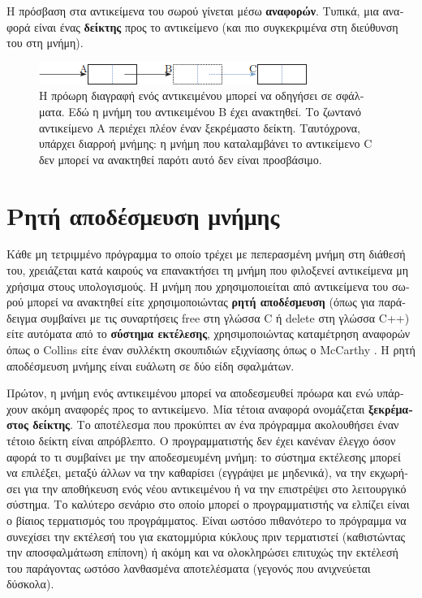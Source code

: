 \begin{greek}
Η πρόσβαση στα αντικείμενα του σωρού γίνεται μέσω \textbf{αναφορών}.
Τυπικά, μια αναφορά είναι ένας \textbf{δείκτης} προς το αντικείμενο
(και πιο συγκεκριμένα στη διεύθυνση του στη μνήμη). 

\begin{figure}[H]
  \centering
  \includegraphics{figures/intro_1}
  \caption[Η πρόωρη διαγραφή ενός αντικειμένου μπορεί να οδηγήσει
           σε σφάλματα]
    {Η πρόωρη διαγραφή ενός αντικειμένου μπορεί να οδηγήσει σε
     σφάλματα. Εδώ η μνήμη του αντικειμένου B έχει ανακτηθεί. Το
     ζωντανό αντικείμενο A περιέχει πλέον έναν ξεκρέμαστο δείκτη.
     Ταυτόχρονα, υπάρχει διαρροή μνήμης: η μνήμη που καταλαμβάνει
     το αντικείμενο C δεν μπορεί να ανακτηθεί παρότι αυτό δεν
     είναι προσβάσιμο.}
   \label{fig:intro_1}  
\end{figure}

\section{Ρητή αποδέσμευση μνήμης}
Κάθε μη τετριμμένο πρόγραμμα το οποίο τρέχει με πεπερασμένη μνήμη
στη διάθεσή του, χρειάζεται κατά καιρούς να επανακτήσει τη μνήμη
που φιλοξενεί αντικείμενα μη χρήσιμα στους υπολογισμούς. Η μνήμη
που χρησιμοποιείται από αντικείμενα του σωρού μπορεί να ανακτηθεί
είτε χρησιμοποιώντας \textbf{ρητή αποδέσμευση} (όπως για παράδειγμα
συμβαίνει με τις συναρτήσεις free στη γλώσσα C ή delete στη
γλώσσα C++) είτε αυτόματα από το \textbf{σύστημα εκτέλεσης},
χρησιμοποιώντας καταμέτρηση αναφορών όπως ο Collins \cite{DBLP:journals/cacm/Collins60}
είτε έναν συλλέκτη σκουπιδιών εξιχνίασης όπως ο McCarthy
\cite{DBLP:journals/cacm/McCarthy60}. Η ρητή αποδέσμευση μνήμης
είναι ευάλωτη σε δύο είδη σφαλμάτων.

Πρώτον, η μνήμη ενός αντικειμένου μπορεί να αποδεσμευθεί πρόωρα και
ενώ υπάρχουν ακόμη αναφορές προς το αντικείμενο. Μία τέτοια αναφορά
ονομάζεται \textbf{ξεκρέμαστος δείκτης}. Το αποτέλεσμα που προκύπτει
αν ένα πρόγραμμα ακολουθήσει έναν τέτοιο δείκτη είναι απρόβλεπτο.
Ο προγραμματιστής δεν έχει κανέναν έλεγχο όσον αφορά το τι συμβαίνει
με την αποδεσμευμένη μνήμη: το σύστημα εκτέλεσης μπορεί να επιλέξει,
μεταξύ άλλων να την καθαρίσει (εγγράψει με μηδενικά), να την
εκχωρήσει για την αποθήκευση ενός νέου αντικειμένου ή να την
επιστρέψει στο λειτουργικό σύστημα. Το καλύτερο σενάριο στο οποίο
μπορεί ο προγραμματιστής να ελπίζει είναι ο βίαιος τερματισμός του
προγράμματος. Είναι ωστόσο πιθανότερο το πρόγραμμα να συνεχίσει
την εκτέλεσή του για εκατομμύρια κύκλους πριν τερματιστεί (καθιστώντας
την αποσφαλμάτωση επίπονη) ή ακόμη και να ολοκληρώσει επιτυχώς
την εκτέλεσή του παράγοντας ωστόσο λανθασμένα αποτελέσματα
(γεγονός που ανιχνεύεται δύσκολα).


\end{greek}
